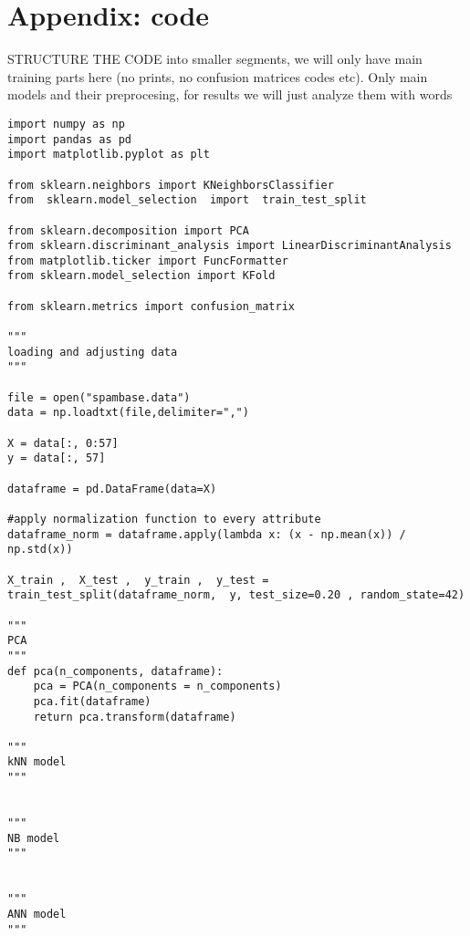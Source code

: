 \documentclass[12pt,a4paper]{article}
\begin{document}
\section*{Appendix: code}
STRUCTURE THE CODE into smaller segments, we will only have main training parts here (no prints, no confusion matrices codes etc). Only main models and their preprocesing, for results we will just analyze them with words
\begin{lstlisting}
import numpy as np
import pandas as pd
import matplotlib.pyplot as plt

from sklearn.neighbors import KNeighborsClassifier
from  sklearn.model_selection  import  train_test_split

from sklearn.decomposition import PCA
from sklearn.discriminant_analysis import LinearDiscriminantAnalysis
from matplotlib.ticker import FuncFormatter
from sklearn.model_selection import KFold

from sklearn.metrics import confusion_matrix

"""
loading and adjusting data
"""

file = open("spambase.data")
data = np.loadtxt(file,delimiter=",")

X = data[:, 0:57]
y = data[:, 57]

dataframe = pd.DataFrame(data=X)

#apply normalization function to every attribute
dataframe_norm = dataframe.apply(lambda x: (x - np.mean(x)) / np.std(x))

X_train ,  X_test ,  y_train ,  y_test = train_test_split(dataframe_norm,  y, test_size=0.20 , random_state=42)

"""
PCA
"""
def pca(n_components, dataframe):
    pca = PCA(n_components = n_components)
    pca.fit(dataframe)
    return pca.transform(dataframe)

"""
kNN model
"""


"""
NB model
"""


"""
ANN model
"""

\end{lstlisting}
\end{document}
